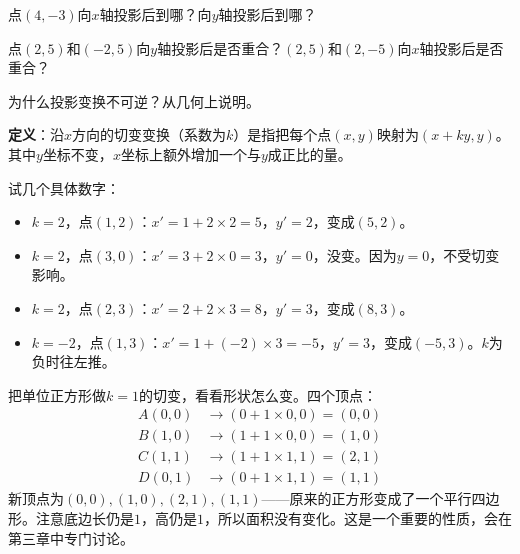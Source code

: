 \begin{exercise}
\item 点$(4,-3)$向$x$轴投影后到哪？向$y$轴投影后到哪？
\item 点$(2,5)$和$( -2,5)$向$y$轴投影后是否重合？$(2,5)$和$(2,-5)$向$x$轴投影后是否重合？
\item 为什么投影变换不可逆？从几何上说明。
\end{exercise}


\textbf{定义}：沿$x$方向的切变变换（系数为$k$）是指把每个点$(x,y)$映射为$(x+ky,y)$。其中$y$坐标不变，$x$坐标上额外增加一个与$y$成正比的量。

试几个具体数字：
\begin{itemize}
\item $k=2$，点$(1,2)$：$x'=1+2\times2=5$，$y'=2$，变成$(5,2)$。
\item $k=2$，点$(3,0)$：$x'=3+2\times0=3$，$y'=0$，没变。因为$y=0$，不受切变影响。
\item $k=2$，点$(2,3)$：$x'=2+2\times3=8$，$y'=3$，变成$(8,3)$。
\item $k=-2$，点$(1,3)$：$x'=1+(-2)\times3=-5$，$y'=3$，变成$(-5,3)$。$k$为负时往左推。
\end{itemize}

把单位正方形做$k=1$的切变，看看形状怎么变。四个顶点：
\begin{align*}
A(0,0) &\to (0+1\times0,0)=(0,0)\\
B(1,0) &\to (1+1\times0,0)=(1,0)\\
C(1,1) &\to (1+1\times1,1)=(2,1)\\
D(0,1) &\to (0+1\times1,1)=(1,1)
\end{align*}
新顶点为$(0,0),(1,0),(2,1),(1,1)$——原来的正方形变成了一个平行四边形。注意底边长仍是$1$，高仍是$1$，所以面积没有变化。这是一个重要的性质，会在第三章中专门讨论。

\begin{center}
\end{center}

